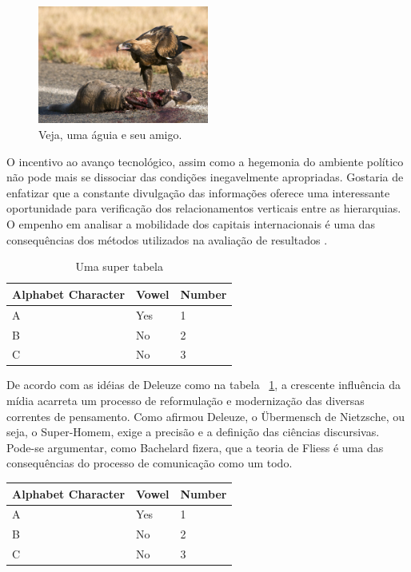 \documentclass[chapter=TITLE,section=Title,espaco=duplo,tocpage=plain,appendix=Name,floatnumber=continuous]{abnt}
\begin{document}
\begin{figure}[h!]
  \centering
  \includegraphics[width=0.5\textwidth]{eagle.jpg}
  \caption[Uma retumbante águia]{Veja, uma águia e seu amigo.}
\end{figure}

O incentivo ao avanço tecnológico, assim como a hegemonia do ambiente
político não pode mais se dissociar das condições inegavelmente
apropriadas. Gostaria de enfatizar que a constante divulgação das
informações oferece uma interessante oportunidade para verificação dos
relacionamentos verticais entre as hierarquias. O empenho em analisar a
mobilidade dos capitais internacionais é uma das consequências dos métodos
utilizados na avaliação de resultados \cite{semolini2002support}.

\begin{table}[h!b!p!]
\centering
\begin{tabular}{lll}
\hline
Alphabet Character & Vowel & Number \\
\hline
A & Yes & 1 \\
B & No & 2 \\
C & No & 3 \\
\hline
\end{tabular}
\caption{Uma super tabela}
\label{tab:seila}
\end{table}

De acordo com as idéias de Deleuze como na tabela ~\ref{tab:seila}, a crescente
influência da mídia acarreta um processo de reformulação e modernização das
diversas correntes de pensamento.  Como afirmou Deleuze, o Übermensch de
Nietzsche, ou seja, o Super-Homem, exige a precisão e a definição das ciências
discursivas.  Pode-se argumentar, como Bachelard fizera, que a teoria de Fliess
é uma das consequências do processo de comunicação como um todo.

\begin{table}[h!b!p!]
\centering
\begin{tabular}{lll}
\hline
Alphabet Character & Vowel & Number \\
\hline
A & Yes & 1 \\
B & No & 2 \\
C & No & 3 \\
\hline
\end{tabular}
\label{quadro:outrola}
\end{table}
\end{document}
